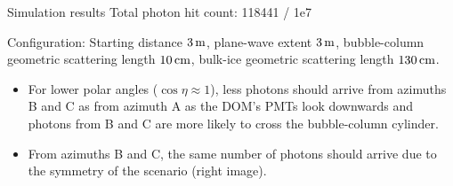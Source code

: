 \begin{frame}[fragile]{Simulation results}
  \tiny Total photon hit count: 118441 / 1e7

  \tiny Configuration: Starting distance $3\text{\,m}$, plane-wave extent $3\text{\,m}$, bubble-column geometric scattering length $10\text{\,cm}$, bulk-ice geometric scattering length $130\text{\,cm}$.
  \normalsize

  \begin{itemize}
    \item For lower polar angles ($\cos\eta \approx 1$), less photons should arrive from azimuths B and C as from azimuth A
      \tiny as the DOM's PMTs look downwards and photons from B and C are more likely to cross the bubble-column cylinder. \normalsize \checkmark
    \item From azimuths B and C, the same number of photons should arrive \tiny due to the symmetry of the scenario (right image). \normalsize \checkmark
  \end{itemize}
\end{frame}

